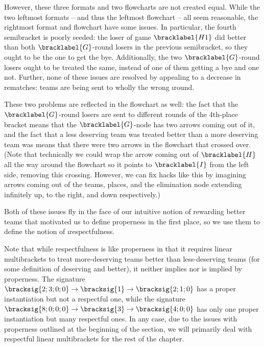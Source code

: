 {    


    However, these three formats and two flowcharts are not created equal. While the two leftmost formats -- and thus the leftmost flowchart -- all seem reasonable, the rightmost format and flowchart have some issues. In particular, the fourth semibracket is poorly seeded: the loser of game $\bracklabel{H1}$ did better than both $\bracklabel{G}$-round losers in the previous semibracket, so they ought to be the one to get the bye. Additionally, the two $\bracklabel{G}$-round losers ought to be treated the same, instead of one of them getting a bye and one not. Further, none of these issues are resolved by appealing to a decrease in rematches: teams are being sent to wholly the wrong \i{round}.

    These two problems are reflected in the flowchart as well: the fact that the $\bracklabel{G}$-round losers are sent to different rounds of the 4th-place bracket means that the $\bracklabel{G}$-node has two arrows coming out of it, and the fact that a less deserving team was treated better than a more deserving team was means that there were two arrows in the flowchart that crossed over. (Note that technically we could wrap the arrow coming out of $\bracklabel{H}$ all the way around the flowchart so it points to $\bracklabel{I}$ from the left side, removing this crossing. However, we can fix hacks like this by imagining arrows coming out of the teams, places, and the elimination node extending infinitely up, to the right, and down respectively.)

    Both of these issues fly in the face of our intuitive notion of rewarding better teams that motivated us to define properness in the first place, so we use them to define the notion of \i{respectfulness}.


    Note that while respectfulness is like properness in that it requires linear multibrackets to treat more-deserving teams better than less-deserving teams (for some definition of deserving and better), it neither implies nor is implied by properness. The signature $\bracksig{2;3;0;0} \to \bracksig{1} \to \bracksig{2;1;0}$ has a proper instantiation but not a respectful one, while the signature $\bracksig{8;0;0;0} \to \bracksig{3} \to \bracksig{4;0;0}$ has only one proper instantiation but many respectful ones. In any case, due to the issues with properness outlined at the beginning of the section, we will primarily deal with respectful linear multibrackets for the rest of the chapter.

}

